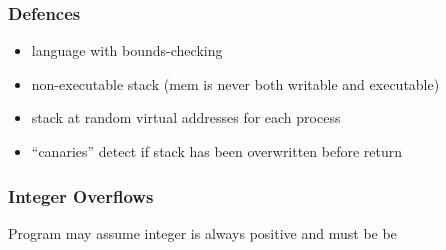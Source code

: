 \documentclass[]{article}
\theoremstyle{definition}
\begin{document}
	\subsubsection{Defences}
	\begin{itemize}
		\item language with bounds-checking
		\item non-executable stack (mem is never both writable and executable)
		\item stack at random virtual addresses for each process
		\item ``canaries'' detect if stack has been overwritten before return
	\end{itemize}

	\subsubsection{Integer Overflows}
	Program may assume integer is always positive and must be be
\end{document}
